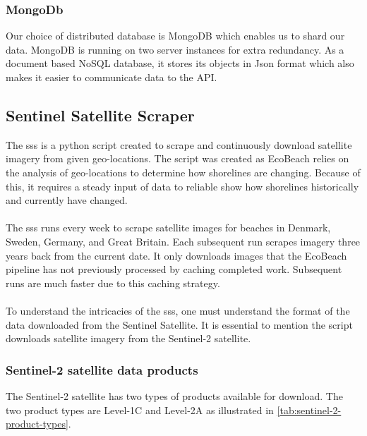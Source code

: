\subsubsection{MongoDb}
Our choice of distributed database is MongoDB which enables us to shard our data. MongoDB is running on two server instances for extra redundancy. As a document based NoSQL database, it stores its objects in Json format which also makes it easier to communicate data to the API.

\subsection{Sentinel Satellite Scraper}\label{subsec:sentinel-satellite-scraper}
The \acrfull{sss} is a python script created to scrape and continuously download satellite imagery from given geo-locations. The script was created as EcoBeach relies on the analysis of geo-locations to determine how shorelines are changing. Because of this, it requires a steady input of data to reliable show how shorelines historically and currently have changed.\\\\
\noindent
The \acrshort{sss} runs every week to scrape satellite images for beaches in Denmark, Sweden, Germany, and Great Britain. Each subsequent run scrapes imagery three years back from the current date. It only downloads images that the EcoBeach pipeline has not previously processed by caching completed work. Subsequent runs are much faster due to this caching strategy. \\\\
\noindent
To understand the intricacies of the \acrshort{sss}, one must understand the format of the data downloaded from the Sentinel Satellite. It is essential to mention the script downloads satellite imagery from the Sentinel-2 satellite.

\subsubsection{Sentinel-2 satellite data products}

The Sentinel-2 satellite has two types of products available for download. The two product types are Level-1C and Level-2A as illustrated in \autoref{tab:sentinel-2-product-types}.

